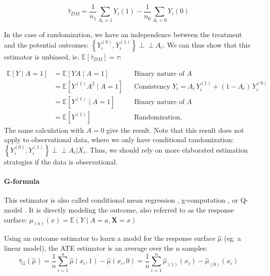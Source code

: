 \documentclass[french,12pt,twoside,a4paper]{book}
\newcommand{\indep}{\perp \!\!\! \perp}
\begin{document}
\begin{appendices}
  \begin{equation}
    \hat \tau_{DM} = \frac{1}{n_1} \sum_{A_i=1} Y_i(1) - \frac{1}{n_0} \sum_{A_i=0} Y_i(0)
  \end{equation}

  In the case of randomization, we have an independence between the treatment
  and the potential outcomes: $\left\{Y_{i}^{(0)}, Y_{i}^{(1)}\right\} \indep
    A_{i}$. We can thus show that this estimator is unbiased, ie.
  $\mathbb{E}[\hat \tau_{DM}] = \tau$:

  \begin{align*}
    \mathbb{E}\left[Y \mid A =1\right] & = \mathbb{E}\left[YA \mid  A=1\right]         &  & \text{Binary nature of $A$}                                       \\
                                       & = \mathbb{E}\left[Y^{(1)}A^2 \mid  A=1\right] &  & \text{Consistency $Y_i = A_i \, Y_i^{(1)} + (1-A_i)\, Y_i^{(0)}$} \\
                                       & = \mathbb{E}\left[Y^{(1)} \mid  A=1\right]    &  & \text{Binary nature of $A$}                                       \\
                                       & = \mathbb{E}\left[ Y^{(1)}\right]             &  & \text{Randomization,}
  \end{align*}
  The same calculation with $A=0$ give the result. Note that this result does
  not apply to observational data, where we only have conditional
  randomization: $\left\{Y_{i}^{(0)}, Y_{i}^{(1)}\right\} \indep A_{i} | X_i$.
  Thus, we should rely on more elaborated estimation strategies if the data is
  observational.

  \paragraph{G-formula} This estimator is also called conditional mean regression
  \citep{wendling2018comparing}, g-computation \citep{robins_role_1986}, or
  Q-model \citep{snowden2011implementation}. It is directly modeling
  the outcome, also referred to as the response surface: $\mu_{(a)}(x)
    =\mathbb{E}\left(Y \mid A=a, \mathbf{X}=x\right)$

  Using an outcome estimator to learn a model for the response surface $\hat
    \mu$ (eg. a linear model), the ATE estimator is an average over the n samples:
  \begin{equation}
    \hat{\tau}_G(\hat \mu) = \frac{1}{n} \sum_{i=1}^n \hat \mu(x_i, 1) - \hat \mu(x_i, 0) = \frac{1}{n} \sum_{i=1}^n \hat \mu_{(1)}(x_i) - \hat \mu_{(0)}(x_i)
  \end{equation}


\end{appendices}
\end{document}
